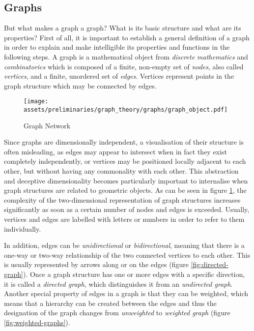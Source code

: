 \documentclass[a4paper, 12pt]{report}
\begin{document}
\subsection{Graphs}\label{subsec:graphs}

But what makes a graph a graph? What is its basic structure and what are its properties? First of all, it is important to establish a general definition of a graph in order to explain and make intelligible its properties and functions in the following steps. A graph is a mathematical object from \textit{discrete mathematics} and \textit{combinatorics} which is composed of a finite, non-empty set of \textit{nodes}, also called \textit{vertices}, and a finite, unordered set of \textit{edges}. Vertices represent points in the graph structure which may be connected by edges.

\begin{figure}
\centering
\texttt{[image: assets/preliminaries/graph\_theory/graphs/graph\_object.pdf]}
\caption{Graph Network}
\label{fig:graph-representation}
\end{figure}

Since graphs are dimensionally independent, a visualisation of their structure is often misleading, as edges may appear to intersect when in fact they exist completely independently, or vertices may be positioned locally adjacent to each other, but without having any commonality with each other. This abstraction and deceptive dimensionality becomes particularly important to internalise when graph structures are related to geometric objects. As can be seen in figure \ref{fig:graph-representation}, the complexity of the two-dimensional representation of graph structures increases significantly as soon as a certain number of nodes and edges is exceeded. Usually, vertices and edges are labelled with letters or numbers in order to refer to them individually.

In addition, edges can be \textit{unidirectional} or \textit{bidirectional}, meaning that there is a one-way or two-way relationship of the two connected vertices to each other. This is usually represented by arrows along or on the edges (figure \ref{fig:directed-graph}). Once a graph structure has one or more edges with a specific direction, it is called a \textit{directed graph}, which distinguishes it from an \textit{undirected graph}. Another special property of edges in a graph is that they can be weighted, which means that a hierarchy can be created between the edges and thus the designation of the graph changes from \textit{unweighted} to \textit{weighted graph} (figure \ref{fig:weighted-graphs}).
\end{document}
